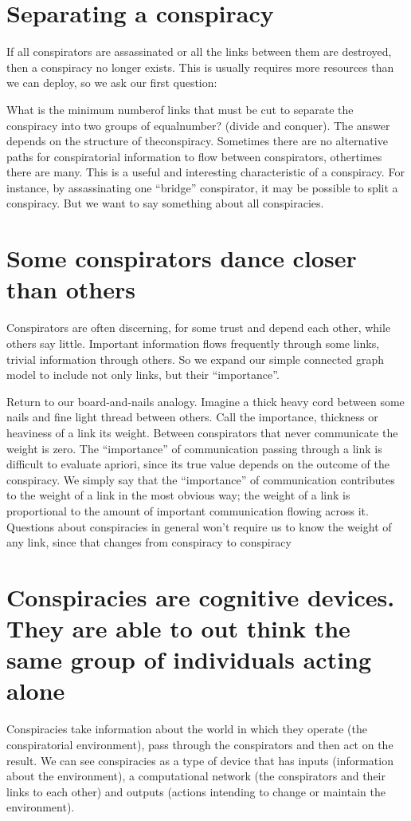 \documentclass[letterpaper,12pt,english]{sphinxmanual}
\begin{document}
\section{Separating a conspiracy}
\label{assange:separating-a-conspiracy}
If all conspirators are assassinated or all the links between them are destroyed, then a conspiracy no longer exists. This is usually requires more resources than we can deploy, so we ask our first question:

What is the minimum numberof links that must be cut to separate the conspiracy into two groups of equalnumber? (divide and conquer). The answer depends on the structure of theconspiracy. Sometimes there are no alternative paths for conspiratorial information to flow between conspirators, othertimes there are many. This is a useful and interesting characteristic of a conspiracy. For instance, by assassinating one “bridge” conspirator, it may be possible to split a conspiracy. But we want to say something about all conspiracies.


\section{Some conspirators dance closer than others}
\label{assange:some-conspirators-dance-closer-than-others}
Conspirators are often discerning, for some trust and depend each other, while others say little. Important information flows frequently through some links,
trivial information through others. So we expand our simple connected graph model to include not only links, but their “importance”.

Return to our board-and-nails analogy. Imagine a thick heavy cord between some nails and fine light thread between others. Call the importance, thickness or heaviness of a link its weight. Between conspirators that never communicate the weight is zero. The “importance” of communication passing through a link is difficult to evaluate apriori, since its true value depends on the outcome of the conspiracy. We simply say that the “importance” of communication contributes to the weight of a link in the most obvious way; the weight of a link is proportional to the amount of important communication flowing across it. Questions about conspiracies in general won’t require us to know the weight of any link, since that changes from conspiracy to conspiracy


\section{Conspiracies are cognitive devices. They are able to out think the same group of individuals acting alone}
\label{assange:conspiracies-are-cognitive-devices-they-are-able-to-out-think-the-same-group-of-individuals-acting-alone}
Conspiracies take information about the world in which they operate (the conspiratorial environment), pass through the conspirators and then act on the result. We can see conspiracies as a type of device that has inputs (information about the environment), a computational network (the conspirators and their links to each other) and outputs (actions intending to change or maintain the environment).
\end{document}
